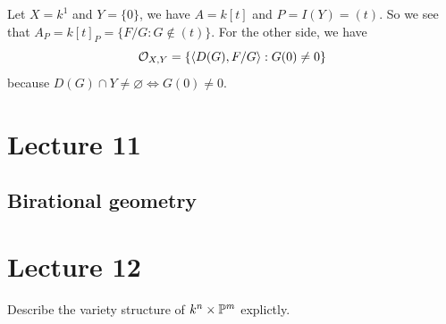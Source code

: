 \begin{example}
    Let $X=k^1$ and $Y=\{0\}$, we have $A=k[t]$ and $P=I(Y)=(t)$. So we see that $A_P=k[t]_P =\{F/G: G\notin (t)\}$. 
    For the other side, we have 
    \begin{equation}
        \mathcal{O}_{X,Y}=\{\langle D(G), F/G \rangle: G(0)\neq0\}
    \end{equation}
    because $D(G)\cap Y\neq\varnothing\iff G(0)\neq0$.
\end{example}

\section{Lecture 11}
\subsection{Birational geometry}

\section{Lecture 12}
\TODO Describe the variety structure of $k^n\times\mathbb{P}^m$ explictly.
